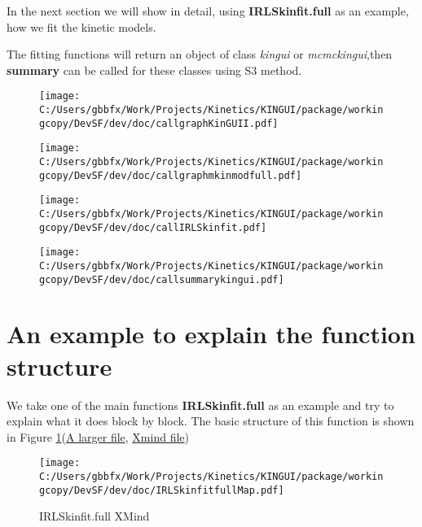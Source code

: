 \documentclass{article}
\begin{document}
In the next section we will show in detail, using \textbf{IRLSkinfit.full} as an example, how we fit the kinetic models.

The fitting functions will return an object of class \textsl{kingui} or \textsl{mcmckingui},then \textbf{summary} can be called for these classes using S3 method.

\begin{figure}[hbtp]
\centering
\texttt{[image: C:/Users/gbbfx/Work/Projects/Kinetics/KINGUI/package/workingcopy/DevSF/dev/doc/callgraphKinGUII.pdf]}
\end{figure}

\begin{figure}[hbtp]
\centering
\texttt{[image: C:/Users/gbbfx/Work/Projects/Kinetics/KINGUI/package/workingcopy/DevSF/dev/doc/callgraphmkinmodfull.pdf]}
\end{figure}


\begin{figure}[hbtp]
\centering
\texttt{[image: C:/Users/gbbfx/Work/Projects/Kinetics/KINGUI/package/workingcopy/DevSF/dev/doc/callIRLSkinfit.pdf]}
\end{figure}

\begin{figure}[hbtp]
\centering
\texttt{[image: C:/Users/gbbfx/Work/Projects/Kinetics/KINGUI/package/workingcopy/DevSF/dev/doc/callsummarykingui.pdf]}
\end{figure}

\section{An example to explain the function structure}

We take one of the main functions \textbf{IRLSkinfit.full} as an example and try to explain what it does block by block. The basic structure of this function is shown in Figure \ref{IRLSmap}(\href{run:IRLSkinfitfullMap.pdf}{A larger file}, \href{run:IRLSkinfit.full.xmind}{Xmind file})
\begin{figure}[hbtp]
\centering
\texttt{[image: C:/Users/gbbfx/Work/Projects/Kinetics/KINGUI/package/workingcopy/DevSF/dev/doc/IRLSkinfitfullMap.pdf]}
\caption{IRLSkinfit.full XMind}
\label{IRLSmap}
\end{figure}
\end{document}
